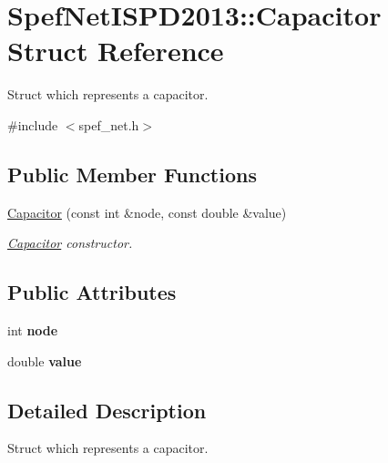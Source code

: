 \hypertarget{structSpefNetISPD2013_1_1Capacitor}{\section{Spef\-Net\-I\-S\-P\-D2013\-:\-:Capacitor Struct Reference}
\label{structSpefNetISPD2013_1_1Capacitor}
}


Struct which represents a capacitor.  




{\ttfamily \#include $<$spef\-\_\-net.\-h$>$}

\subsection*{Public Member Functions}
\begin{DoxyCompactItemize}
\item 
\hyperlink{structSpefNetISPD2013_1_1Capacitor_a4aa1ee73d32e9e916057e24a229f3757}{Capacitor} (const int \&node, const double \&value)
\begin{DoxyCompactList}\small\item\em \hyperlink{structSpefNetISPD2013_1_1Capacitor}{Capacitor} constructor. \end{DoxyCompactList}\end{DoxyCompactItemize}
\subsection*{Public Attributes}
\begin{DoxyCompactItemize}
\item 
\hypertarget{structSpefNetISPD2013_1_1Capacitor_a137cb22b268fa33013b463c040b66240}{int {\bfseries node}}\label{structSpefNetISPD2013_1_1Capacitor_a137cb22b268fa33013b463c040b66240}

\item 
\hypertarget{structSpefNetISPD2013_1_1Capacitor_a7aed9c0945e3baccf5d774352400a238}{double {\bfseries value}}\label{structSpefNetISPD2013_1_1Capacitor_a7aed9c0945e3baccf5d774352400a238}

\end{DoxyCompactItemize}


\subsection{Detailed Description}
Struct which represents a capacitor. 



